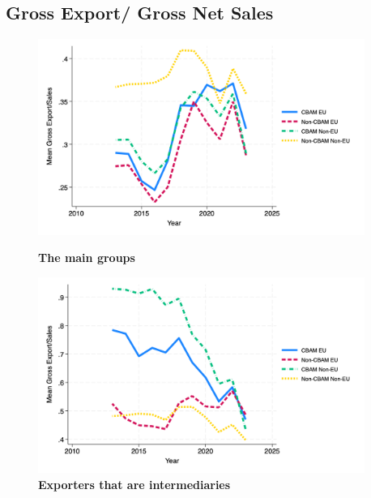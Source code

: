 \documentclass{article}
\begin{document}
\subsection{Gross Export/ Gross Net Sales}
\begin{figure}[H]
\centering
\includegraphics[width=0.95\textwidth]{gross_all.png}
\caption{\textbf{The main groups}}
\includegraphics[width=0.95\textwidth]{gross_ei.png}
\caption{\textbf{Exporters that are intermediaries}}
\end{figure}
\end{document}
